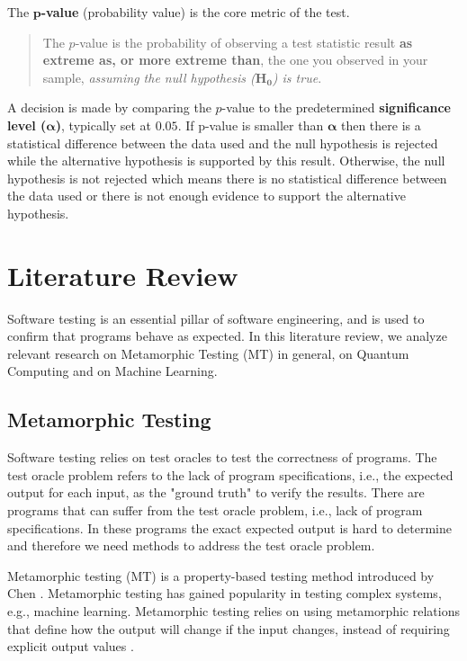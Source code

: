 \documentclass[12pt,a4paper]{article}
\begin{document}
	The $\boldsymbol{p}$\textbf{-value} (probability value) is the core metric of the test.
	
	\begin{quote}
		The $p$-value is the probability of observing a test statistic result \textbf{as extreme as, or more extreme than}, the one you observed in your sample, \textit{assuming the null hypothesis ($\mathbf{H_0}$) is true}.
	\end{quote}
	
	A decision is made by comparing the $p$-value to the predetermined \textbf{significance level ($\boldsymbol{\alpha}$)}, typically set at $0.05$. If p-value is smaller than $\boldsymbol{\alpha}$ then there is a statistical difference between the data used and the null hypothesis is rejected while the alternative hypothesis is supported by this result. Otherwise, the null hypothesis is not rejected which means there is no statistical difference between the data used or there is not enough evidence to support the alternative hypothesis.
	
	\section{Literature Review}
	\label{sec:LiteratureReview}
	Software testing is an essential pillar of software engineering, and is used to confirm that programs behave as expected. In this literature review, we analyze relevant research on Metamorphic Testing (MT) in general, on Quantum Computing and on Machine Learning.
	
	\subsection{Metamorphic Testing}
	
	Software testing relies on test oracles to test the correctness of programs. The test oracle problem refers to the lack of program specifications, i.e., the expected output for each input, as the "ground truth" to verify the results. There are programs that can suffer from the test oracle problem, i.e., lack of program specifications. In these programs the exact expected output is hard to determine and therefore we need methods to address the test oracle problem. 
	
	Metamorphic testing (MT) is a property-based testing method introduced by Chen \cite{mt1998}. Metamorphic testing has gained popularity in testing complex systems, e.g., machine learning. Metamorphic testing relies on using metamorphic relations that define how the output will change if the input changes, instead of requiring explicit output values \cite{xu2024mrscoutautomatedsynthesismetamorphic}.
	
\end{document}

